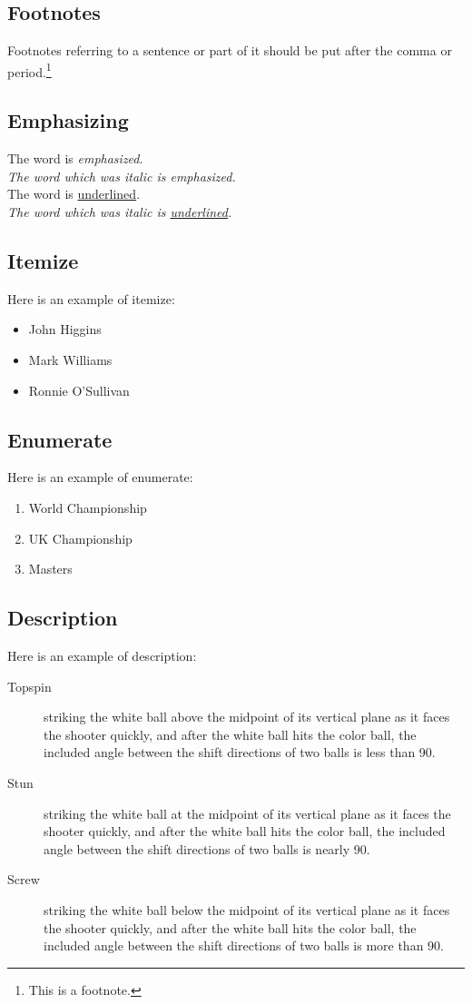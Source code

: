 \documentclass[a4paper,10pt]{article}
\begin{document}
    \subsection{Footnotes}
    Footnotes referring to a sentence or part of it should be put
    after the comma or period.\footnote{This is a footnote.}
    \subsection{Emphasizing}
    The word is \emph{emphasized}.\\
    \textit{The word which was italic is \emph{emphasized}.}\\
    The word is \uline{underlined}.\\
    \textit{The word which was italic is \uline{underlined}.}
    \subsection{Itemize}
    Here is an example of itemize:
    \begin{itemize}
        \item John Higgins
        \item Mark Williams
        \item Ronnie O'Sullivan
    \end{itemize}
    \subsection{Enumerate}
    Here is an example of enumerate:
    \begin{enumerate}
        \item World Championship
        \item UK Championship
        \item Masters
    \end{enumerate}
    \subsection{Description}
    Here is an example of description:
    \begin{description}
        \item[Topspin] striking the white ball above the midpoint of its
        vertical plane as it faces the shooter quickly, and after the white
        ball hits the color ball, the included angle between the shift
        directions of two balls is less than 90\textdegree{}.
        \item[Stun] striking the white ball at the midpoint of its vertical
        plane as it faces the shooter quickly, and after the white ball hits
        the color ball, the included angle between the shift directions of two
        balls is nearly 90\textdegree{}.
        \item[Screw] striking the white ball below the midpoint of its vertical
        plane as it faces the shooter quickly, and after the white ball hits
        the color ball, the included angle between the shift directions of two
        balls is more than 90\textdegree{}.
    \end{description}
\end{document}
